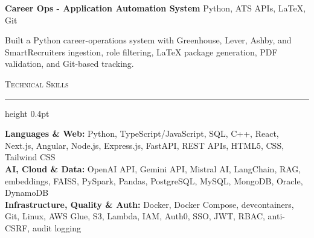 \documentclass[letterpaper,11pt]{article}
\newcommand{\resumesection}[1]{%
  \par\vspace{2pt}%
  {\large\scshape #1}\par\vspace{2pt}%
  \hrule height 0.4pt\vspace{2pt}%
}
\newcommand{\projectHeading}[2]{
  \textbf{#1} \hfill #2
}
\begin{document}
\projectHeading{Career Ops - Application Automation System}{Python, ATS APIs, LaTeX, Git}
\begin{tightitemize}
  \item Built a Python career-operations system with Greenhouse, Lever, Ashby, and SmartRecruiters ingestion, role filtering, LaTeX package generation, PDF validation, and Git-based tracking.
\end{tightitemize}

\resumesection{Technical Skills}
\textbf{Languages \& Web:} Python, TypeScript/JavaScript, SQL, C++, React, Next.js, Angular, Node.js, Express.js, FastAPI, REST APIs, HTML5, CSS, Tailwind CSS\\
\textbf{AI, Cloud \& Data:} OpenAI API, Gemini API, Mistral AI, LangChain, RAG, embeddings, FAISS, PySpark, Pandas, PostgreSQL, MySQL, MongoDB, Oracle, DynamoDB\\
\textbf{Infrastructure, Quality \& Auth:} Docker, Docker Compose, devcontainers, Git, Linux, AWS Glue, S3, Lambda, IAM, Auth0, SSO, JWT, RBAC, anti-CSRF, audit logging
\end{document}
